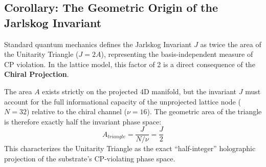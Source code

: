 \subsection{Corollary: The Geometric Origin of the Jarlskog Invariant}

Standard quantum mechanics defines the Jarlskog Invariant $J$ as twice the area of the Unitarity Triangle ($J = 2A$), representing the basis-independent measure of CP violation. In the lattice model, this factor of 2 is a direct consequence of the \textbf{Chiral Projection}. 

The area $A$ exists strictly on the projected 4D manifold, but the invariant $J$ must account for the full informational capacity of the unprojected lattice node ($N=32$) relative to the chiral channel ($\nu=16$). The geometric area of the triangle is therefore exactly half the invariant phase space:
\begin{equation}
    A_{triangle} = \frac{J}{N/\nu} = \frac{J}{2}
\end{equation}
This characterizes the Unitarity Triangle as the exact ``half-integer'' holographic projection of the substrate's CP-violating phase space.